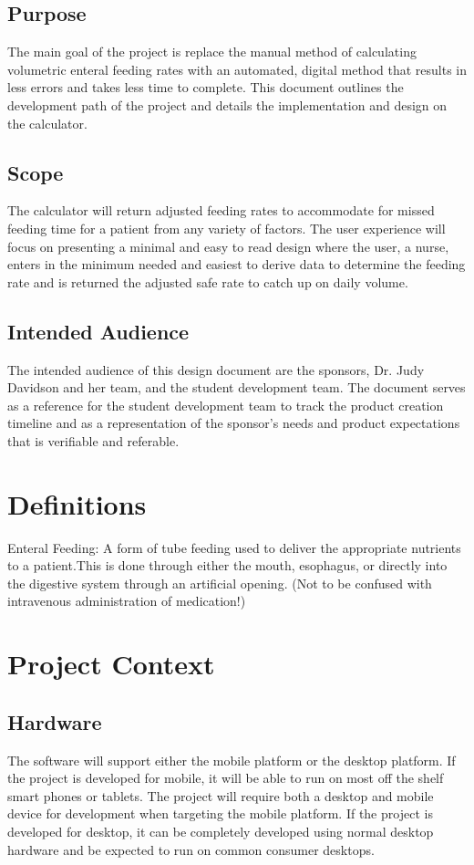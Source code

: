 \documentclass[onecolumn, draftclsnofoot,10pt, compsoc]{IEEEtran}
\begin{document}
\subsection{Purpose}
The main goal of the project is replace the manual method of calculating volumetric enteral feeding rates with an automated, digital method that results in less errors and takes less time to complete.
This document outlines the development path of the project and details the implementation and design on the calculator.
\subsection{Scope}
The calculator will return adjusted feeding rates to accommodate for missed feeding time for a patient from any variety of factors.
The user experience will focus on presenting a minimal and easy to read design where the user, a nurse, enters in the minimum needed and easiest to derive data to determine the feeding rate and is returned the adjusted safe rate to catch up on daily volume.
\subsection{Intended Audience}
The intended audience of this design document are the sponsors, Dr. Judy Davidson and her team, and the student development team.
The document serves as a reference for the student development team to track the product creation timeline and as a representation of the sponsor's needs and product expectations that is verifiable and referable.
\section{Definitions}
Enteral Feeding: A form of tube feeding used to deliver the appropriate nutrients to a patient.This is done through either the mouth, esophagus, or directly into the digestive system through an artificial opening. (Not to be confused with intravenous administration of medication!)
\newline
\newline

\section{Project Context}
\subsection{Hardware}
The software will support either the mobile platform or the desktop platform.
If the project is developed for mobile, it will be able to run on most off the shelf smart phones or tablets.
The project will require both a desktop and mobile device for development when targeting the mobile platform.
If the project is developed for desktop, it can be completely developed using normal desktop hardware and be expected to run on common consumer desktops.
\end{document}
